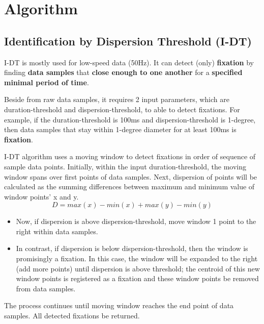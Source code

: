 \documentclass[sigchi-a]{acmart}
\begin{document}


\maketitle


\section{Algorithm}
\subsection{Identification by Dispersion Threshold (I-DT)}

I-DT is mostly used for low-speed data (50Hz).
It can detect (only) \textbf{fixation} by finding \textbf{data samples} that \textbf{close enough to one another} for a \textbf{specified minimal period of time}.

Beside from raw data samples, it requires 2 input parameters, which are duration-threshold and dispersion-threshold, to able to detect fixations.
For example, if the duration-threshold is 100ms and dispersion-threshold is 1-degree, then data samples that stay within 1-degree diameter for at least 100ms is \textbf{fixation}. \cite{Holmqvist11}

I-DT algorithm uses a moving window to detect fixations in order of sequence of sample data points.
Initially, within the input duration-threshold, the moving window spans over first points of data samples. Next, dispersion of points will be calculated as the summing differences between maximum and minimum value of window points' x and y.
\begin{equation}
D = max(x)-min(x)+max(y)-min(y)
\end{equation}
\begin{itemize}
\item Now, if dispersion is above dispersion-threshold, move window 1 point to the right within data samples.
\item In contrast, if dispersion is below dispersion-threshold, then the window is promisingly a fixation. In this case, the window will be expanded to the right (add more points) until dispersion is above threshold; the centroid of this new window points is registered as a fixation and these window points be removed from data samples.
\end{itemize}
The process continues until moving window reaches the end point of data samples. All detected fixations be returned. \cite{Punde16} 
\end{document}
